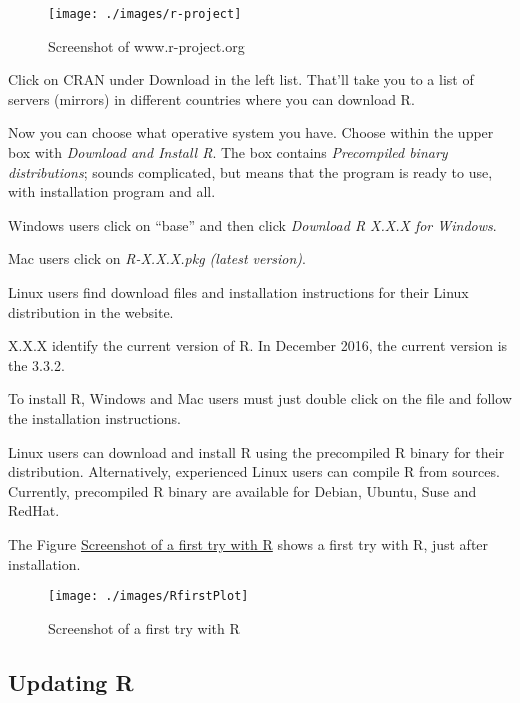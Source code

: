 \documentclass[]{book}
\begin{document}
\begin{figure}[h]

{\centering \texttt{[image: ./images/r-project]} 

}

\caption{Screenshot of www.r-project.org}\label{fig:g1}
\end{figure}

Click on CRAN under Download in the left list. That'll take you to a
list of servers (mirrors) in different countries where you can download
R.

Now you can choose what operative system you have. Choose within the
upper box with \emph{Download and Install R}. The box contains
\emph{Precompiled binary distributions}; sounds complicated, but means
that the program is ready to use, with installation program and all.

Windows users click on ``base'' and then click \emph{Download R X.X.X
for Windows}.

Mac users click on \emph{R-X.X.X.pkg (latest version)}.

Linux users find download files and installation instructions for their
Linux distribution in the website.

X.X.X identify the current version of R. In December 2016, the current
version is the 3.3.2.

To install R, Windows and Mac users must just double click on the file
and follow the installation instructions.

Linux users can download and install R using the precompiled R binary
for their distribution. Alternatively, experienced Linux users can
compile R from sources. Currently, precompiled R binary are available
for Debian, Ubuntu, Suse and RedHat.

The Figure \protect\hyperlink{fig:ssFirsttry}{Screenshot of a first try
with R} shows a first try with R, just after installation.

\hypertarget{fig:ssFirsttry}{}
\begin{figure}[h]

{\centering \texttt{[image: ./images/RfirstPlot]} 

}

\caption{Screenshot of a first try with R}\label{fig:g2}
\end{figure}

\subsection{Updating R}\label{updating-r}
\end{document}
